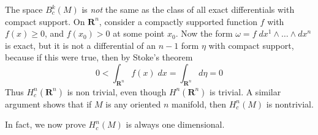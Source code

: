 \begin{example}
    The space $B^k_c(M)$ is {\it not} the same as the class of all exact differentials with compact support. On $\mathbf{R}^n$, consider a compactly supported function $f$ with $f(x) \geq 0$, and $f(x_0) > 0$ at some point $x_0$. Now the form $\omega = f\; dx^1 \wedge \dots \wedge dx^n$ is exact, but it is not a differential of an $n-1$ form $\eta$ with compact support, because if this were true, then by Stoke's theorem
    \[ 0 < \int_{\mathbf{R}^n} f(x)\; dx = \int_{\mathbf{R}^n} d\eta = 0 \]
    Thus $H^n_c(\mathbf{R}^n)$ is non trivial, even though $H^n(\mathbf{R}^n)$ is trivial. A similar argument shows that if $M$ is any oriented $n$ manifold, then $H^n_c(M)$ is nontrivial.
\end{example}

In fact, we now prove $H^n_c(M)$ is always one dimensional.

